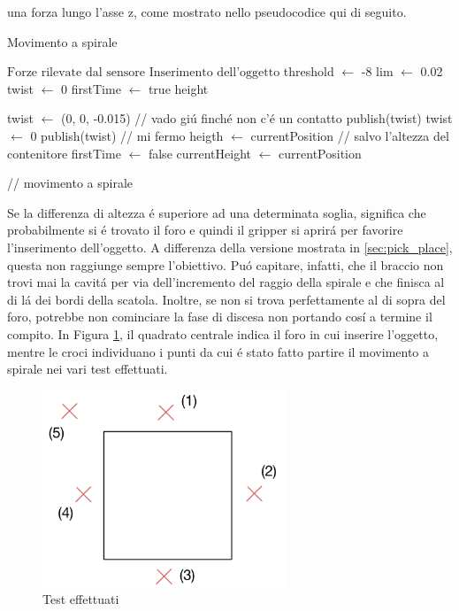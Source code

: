 una forza lungo l'asse z, come mostrato nello pseudocodice qui di seguito. 
\newpage
\begin{algorithm}[H]
    \caption{Movimento a spirale}\label{algo:spiral}
    \begin{algorithmic}[1]
        \Require $\text{Forze rilevate dal sensore}$
        \Ensure $\text{Inserimento dell'oggetto}$
        \State threshold $\gets$ -8
        \State lim $\gets$ 0.02
        \State twist $\gets$ 0
        \State firstTime $\gets$ true
        \State height
        
        \Repeat 
                \State twist $\gets$ (0, 0, -0.015) // vado gi\'{u} finch\'{e} non c'\'{e} un contatto
                \State publish(twist)
            \EndWhile
            \State twist $\gets$ 0
            \State publish(twist) // mi fermo
                \State heigth $\gets$ currentPosition // salvo l'altezza del contenitore
                \State firstTime $\gets$ false
            \EndIf
            \State currentHeight $\gets$ currentPosition

                // movimento a spirale
            \EndWhile
    \end{algorithmic}
    \end{algorithm}
Se la differenza di altezza \'{e} superiore ad una determinata soglia, significa che probabilmente si \'{e} 
trovato il foro e quindi il gripper si aprir\'{a} per favorire l'inserimento dell'oggetto. 
A differenza della versione mostrata in \ref{sec:pick_place}, questa non raggiunge sempre l'obiettivo. 
Pu\'{o} capitare, infatti, che il braccio non trovi mai la cavit\'{a} per via dell'incremento del raggio della spirale e che finisca 
al di l\'{a} dei bordi della scatola. Inoltre, se non si trova perfettamente al di sopra del foro, potrebbe non cominciare la 
fase di discesa non portando cos\'{i} a termine il compito. 
In Figura \ref{fig:spiral_insertion}, il quadrato centrale indica il foro in cui inserire l'oggetto, mentre le croci individuano i 
punti da cui \'{e} stato fatto partire il movimento a spirale nei vari test effettuati. 
\begin{figure}[H]
    \centering
    \includegraphics*[width=0.65\textwidth]{images/spiral.png}
    \caption{Test effettuati}
    \label{fig:spiral_insertion}
\end{figure}
